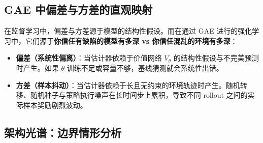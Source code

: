 \subsection{GAE 中偏差与方差的直观映射}
\label{intuitive-mapping-of-bias-and-variance-in-gae}

在监督学习中，偏差与方差源于模型的结构性假设。而在通过 GAE 进行的强化学习中，它们源于\textbf{你信任有缺陷的模型有多深 vs 你信任混乱的环境有多深}：

\begin{itemize}
  \item \textbf{偏差（系统性偏离）}：当估计器依赖于价值网络 $V_\theta$ 的结构性假设与不完美预测时产生。如果 $\theta$ 训练不足或容量不够，基线猜测就会系统性出错。
  \item \textbf{方差（样本抖动）}：当估计器依赖于长且无约束的环境轨迹时产生。随机转移、随机种子与策略执行噪声在长时间步上累积，导致不同 rollout 之间的实际样本奖励剧烈波动。
\end{itemize}

\subsection{架构光谱：边界情形分析}
\label{the-architectural-spectrum-boundary-analysis}


